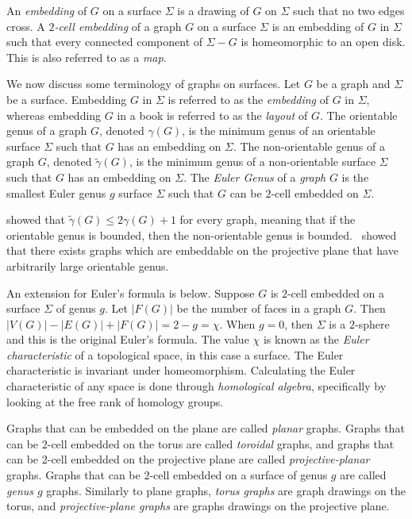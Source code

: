 An \textit{embedding} of $G$ on a surface $\Sigma$ is a drawing of $G$ on $\Sigma$ such that no two edges cross. 
A \textit{$2$-cell embedding} of a graph $G$ on a surface $\Sigma$ is an embedding of $G$ in $\Sigma$ such that every connected component of $\Sigma - G$ is homeomorphic to an open disk. This is also referred to as a \textit{map}.

We now discuss some terminology of graphs on surfaces. Let $G$ be a graph and $\Sigma$ be a surface. Embedding $G$ in $\Sigma$ is referred to as the \textit{embedding} of $G$ in $\Sigma$, whereas embedding $G$ in a book is referred to as the \textit{layout} of $G$. The orientable genus of a graph \(G\), denoted \(\gamma(G)\), is the minimum genus of an orientable surface $\Sigma$ such that $G$ has an embedding on $\Sigma$. The non-orientable genus of a graph \(G\), denoted \(\tilde{\gamma}(G)\), is the minimum genus of a non-orientable surface $\Sigma$ such that $G$ has an embedding on $\Sigma$. 
The \textit{Euler Genus} of a \textit{graph} \(G\) is the smallest Euler genus \(g\) surface \(\Sigma\) such that \(G\) can be $2$-cell embedded on $\Sigma$.

\textcite{moharOrientableGenusGraphs1998} showed that \(\tilde{\gamma}(G) \leq 2 \gamma(G) + 1\) for every graph, meaning that if the orientable genus is bounded, then the non-orientable genus is bounded.\ \textcite{auslanderImbeddingGraphsManifolds1963} showed that there exists graphs which are embeddable on the projective plane that have arbitrarily large orientable genus. 

An extension for Euler's formula is below. Suppose $G$ is $2$-cell embedded on a surface $\Sigma$ of genus $g$. Let \(|F(G)|\) be the number of faces in a graph \(G\). Then \(|V(G)| - |E(G)| + |F(G)| = 2 - g = \chi\). When $g = 0$, then $\Sigma$ is a $2$-sphere and this is the original Euler's formula. 
The value $\chi$ is known as the \textit{Euler characteristic} of a topological space, in this case a surface. The Euler characteristic is invariant under homeomorphism. Calculating the Euler characteristic of any space is done through \textit{homological algebra}, specifically by looking at the free rank of homology groups. 

Graphs that can be embedded on the plane are called \textit{planar} graphs. Graphs that can be 2-cell embedded on the torus are called \textit{toroidal} graphs, and graphs that can be 2-cell embedded on the projective plane are called \textit{projective-planar} graphs. Graphs that can be 2-cell embedded on a surface of genus $g$ are called \textit{genus $g$} graphs. Similarly to plane graphs, \textit{torus graphs} are graph drawings on the torus, and \textit{projective-plane graphs} are graphs drawings on the projective plane. 

